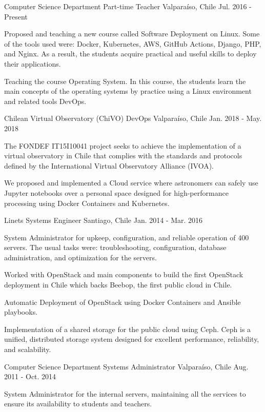 \begin{cventries}
  \cventry
    {Computer Science Department}
    {Part-time Teacher}
    {Valparaíso, Chile}
    {Jul. 2016 - Present}
    {
      \begin{cvitems}
        \item {Proposed and teaching a new course called Software Deployment on Linux. Some of the tools used were: Docker, Kubernetes, AWS, GitHub Actions, Django, PHP, and Nginx. As a result, the students acquire practical and useful skills to deploy their applications.}
        \item {Teaching the course Operating System. In this course, the students learn the main concepts of the operating systems by practice using a Linux environment and related tools DevOps.}
      \end{cvitems}
    }
    
    
  \cventry
    {Chilean Virtual Observatory (ChiVO)}
    {DevOps}
    {Valparaíso, Chile}
    {Jan. 2018 - May. 2018}
    {
      \begin{cvitems}
        \item {The FONDEF IT15I10041 project seeks to achieve the implementation of a virtual observatory in Chile that complies with the standards and protocols defined by the International Virtual Observatory Alliance (IVOA).}
        \item {We proposed and implemented a Cloud service where astronomers can safely use Jupyter notebooks over a personal space designed for high-performance processing using Docker Containers and Kubernetes.}
      \end{cvitems}
    }
    

  \cventry
    {Linets}
    {Systems Engineer}    
    {Santiago, Chile}
    {Jan. 2014 - Mar. 2016}
    {
      \begin{cvitems}
        \item {System Administrator for upkeep, configuration, and reliable operation of 400 servers. The usual tasks were: troubleshooting, configuration, database administration, and optimization for the servers.}
        \item {Worked with OpenStack and main components to build the first OpenStack deployment in Chile which backs Beebop, the first public cloud in Chile.}
        \item {Automatic Deployment of OpenStack using Docker Containers and Ansible playbooks.}
        \item {Implementation of a shared storage for the public cloud using Ceph. Ceph is a unified, distributed storage system designed for excellent performance, reliability, and scalability.}
      \end{cvitems}
    }
    
  \cventry
    {Computer Science Department}
    {Systems Administrator}    
    {Valparaíso, Chile}
    {Aug. 2011 - Oct. 2014}
    {
      \begin{cvitems}
		\item{System Administrator for the internal servers, maintaining all the services to ensure its availability to students and teachers.}
      \end{cvitems}
    }    
\end{cventries}
